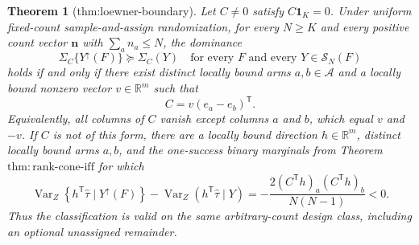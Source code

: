 \documentclass{article}
\newtheorem{theorem}{Theorem}
\begin{document}
\begin{theorem}[thm:loewner-boundary]\label{thm:loewner-boundary}
Let \(C\ne0\) satisfy \(C\mathbf 1_K=0\).  Under uniform fixed-count sample-and-assign randomization, for every \(N\geq K\) and every positive count vector \(\mathbf n\) with \(\sum_a n_a\leq N\), the dominance
\[
\Sigma_C\{Y^{\uparrow}(F)\}\succeq\Sigma_C(Y)
\quad\text{for every }F\text{ and every }Y\in\mathcal S_N(F)
\]
holds if and only if there exist distinct locally bound arms \(a,b\in\mathcal A\) and a locally bound nonzero vector \(v\in\mathbb R^m\) such that
\[
C=v(e_a-e_b)^{\mathsf T}.
\]
Equivalently, all columns of \(C\) vanish except columns \(a\) and \(b\), which equal \(v\) and \(-v\).  If \(C\) is not of this form, there are a locally bound direction \(h\in\mathbb R^m\), distinct locally bound arms \(a,b\), and the one-success binary marginals from Theorem \(\mathrm{thm{:}rank\text{-}cone\text{-}iff}\) for which
\[
\operatorname{Var}_Z\!\left\{h^{\mathsf T}\widehat\tau\mid Y^{\uparrow}(F)\right\}
-\operatorname{Var}_Z\!\left(h^{\mathsf T}\widehat\tau\mid Y\right)
=-\frac{2(C^{\mathsf T}h)_a(C^{\mathsf T}h)_b}{N(N-1)}<0.
\]
Thus the classification is valid on the same arbitrary-count design class, including an optional unassigned remainder.
\end{theorem}
\end{document}
